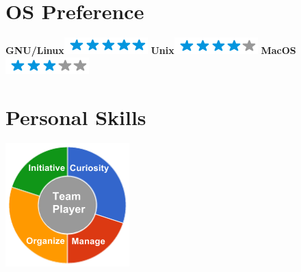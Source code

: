 \documentclass[]{friggeri-cv}
\begin{document}
\begin{aside}
  \section{OS Preference}
    \textbf{GNU/Linux}\includegraphics[scale=0.40]{img/5stars.png}
    \textbf{Unix}\includegraphics[scale=0.40]{img/4stars.png}
    \textbf{MacOS}\includegraphics[scale=0.40]{img/3stars.png}
    ~
  \section{Personal Skills}
    \includegraphics[scale=0.62]{img/personal.png}
    ~
\end{aside}
\end{document}

